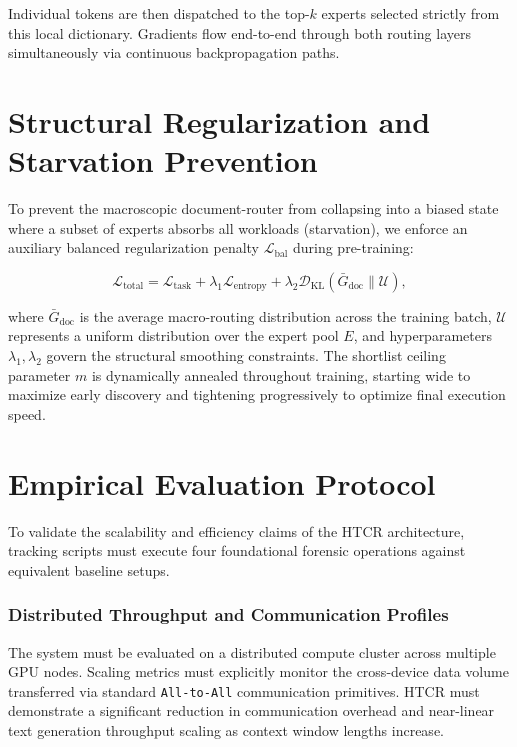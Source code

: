 Individual tokens are then dispatched to the top-$k$ experts selected strictly from this local dictionary. Gradients flow end-to-end through both routing layers simultaneously via continuous backpropagation paths.

\chapter{Structural Regularization and Starvation Prevention}

To prevent the macroscopic document-router from collapsing into a biased state where a subset of experts absorbs all workloads (starvation), we enforce an auxiliary balanced regularization penalty $\mathcal{L}_{\text{bal}}$ during pre-training:

\begin{equation}
\mathcal{L}_{\text{total}} = \mathcal{L}_{\text{task}} + \lambda_1 \mathcal{L}_{\text{entropy}} + \lambda_2 \mathcal{D}_{\text{KL}}\left(\bar{G}_{\text{doc}} \parallel \mathcal{U}\right),
\end{equation}

where $\bar{G}_{\text{doc}}$ is the average macro-routing distribution across the training batch, $\mathcal{U}$ represents a uniform distribution over the expert pool $E$, and hyperparameters $\lambda_1, \lambda_2$ govern the structural smoothing constraints. The shortlist ceiling parameter $m$ is dynamically annealed throughout training, starting wide to maximize early discovery and tightening progressively to optimize final execution speed.

\chapter{Empirical Evaluation Protocol}

To validate the scalability and efficiency claims of the HTCR architecture, tracking scripts must execute four foundational forensic operations against equivalent baseline setups.

\subsection{Distributed Throughput and Communication Profiles}
The system must be evaluated on a distributed compute cluster across multiple GPU nodes. Scaling metrics must explicitly monitor the cross-device data volume transferred via standard \texttt{All-to-All} communication primitives. HTCR must demonstrate a significant reduction in communication overhead and near-linear text generation throughput scaling as context window lengths increase.

